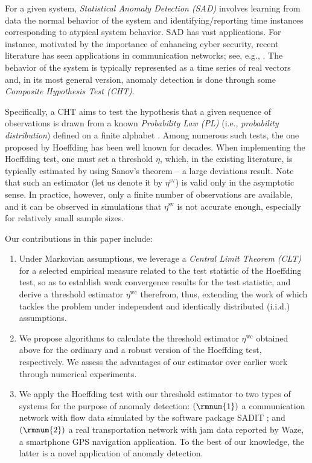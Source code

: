 \documentclass[10pt, twocolumn]{IEEEtran}
\begin{document}
For a given system, {\em Statistical Anomaly Detection (SAD)} involves
learning from data the normal behavior of the system and
identifying/reporting time instances corresponding to atypical system
behavior. SAD has vast applications. For instance, motivated by the
importance of enhancing cyber security, recent literature has seen
applications in communication networks; see, e.g.,
\cite{pas-sma-ton-09,CDC09,wa-ro-ca-pa-anomaly-cdc13,robust-anomaly-tcns}. The
behavior of the system is typically represented as a time series of real
vectors and, in its most general version, anomaly detection is done
through some {\em Composite Hypothesis Test (CHT)}.

Specifically, a CHT aims to test the hypothesis that a given sequence of
observations is drawn from a known \textit{Probability Law (PL)} (i.e.,
\textit{probability distribution}) defined on a finite alphabet
\cite{TIT13}. Among numerous such tests, the one proposed by Hoeffding
\cite{hoeffding1965} has been well known for decades. When implementing
the Hoeffding test, one must set a threshold $\eta$, which, in the
existing literature, is typically estimated by using Sanov's theorem
\cite{dembo1998large} -- a large deviations result. Note that such an
estimator (let us denote it by $\eta^{\text{sv}}$) is valid only in the
asymptotic sense. In practice, however, only a finite number of
observations are available, and it can be observed in simulations that
$\eta^{\text{sv}}$ is not accurate enough, especially for relatively small
sample sizes.

Our contributions in this paper include:

\begin{enumerate}
\item Under Markovian assumptions, we leverage a
  {\em Central Limit Theorem (CLT)} for a selected empirical measure
  related to the test statistic of the Hoeffding test, so as to establish weak convergence results for the test statistic, and derive a threshold estimator
  $\eta^{\text{wc}}$ therefrom, thus, extending the work of \cite{TIT13} which tackles
  the problem under independent and identically distributed (i.i.d.)
  assumptions.

\item We propose algorithms to calculate the threshold estimator
  $\eta^{\text{wc}}$ obtained above for the ordinary and a robust version of
  the Hoeffding test, respectively. We assess the advantages of our
  estimator over earlier work through numerical experiments. 

\item We apply the Hoeffding test with our threshold estimator to two
  types of systems for the purpose of anomaly detection: $(\rmnum{1})$ a
  communication network with flow data simulated by the software package
  SADIT \cite{SADIT}; and $(\rmnum{2})$ a real transportation network with jam
  data reported by Waze, a smartphone GPS navigation application. To the
  best of our knowledge, the latter is a novel application of anomaly
  detection.
\end{enumerate}
\end{document}
